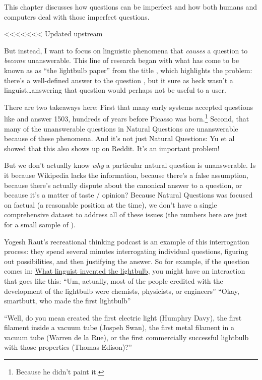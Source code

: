 
This chapter discusses how questions can be imperfect and how both humans and computers deal with those imperfect questions.



<<<<<<< Updated upstream

But instead, I want to focus on linguistic phenomena that \emph{causes} a question to \emph{become} unanswerable.  
%
This line of research began with what has come to be known as as ``the lightbulb paper'' from the title , 
%
which highlights the problem: there’s a well-defined answer to the question , 
%
but it sure as heck wasn’t a linguist\dots answering that question would perhaps not be useful to a user.

There are two takeaways here: First that many early  systems accepted questions like  and answer 1503, hundreds of years before Picasso was born.\footnote{Because he didn't paint it.}
%
Second, that many of the unanswerable questions in Natural Questions are unanswerable because of these phenomena.  
%
And it’s not just Natural Questions: Yu et al~\citep{} showed that this also shows up on Reddit.  It’s an important problem!

But we don’t actually know \emph{why} a particular natural question is unanswerable.  
%
Is it because Wikipedia lacks the information, because there’s a false assumption, because there’s actually dispute about the canonical answer to a question, or because it’s a matter of taste / opinion?  
%
Because Natural Questions was focused on factual  (a reasonable position at the time), we don’t have a single comprehensive dataset to address all of these issues (the numbers here are just for a small sample of ).



Yogesh Raut’s recreational thinking podcast is an example of this interrogation process: they spend several minutes interrogating individual questions, figuring out possibilities, and then justifying the answer.
%
So for example, if the question comes in: \underline{What linguist invented the lightbulb}, you might have an interaction that goes like this:
%
``Um, actually, most of the people credited with the development of the lightbulb were chemists, physicists, or engineers''
%
``Okay, smartbutt, who made the first lightbulb''

“Well, do you mean created the first electric light (Humphry Davy), the first filament inside a vacuum tube (Jospeh Swan), the first metal filament in a vacuum tube (Warren de la Rue), or the first commercially successful lightbulb with those properties (Thomas Edison)?”

